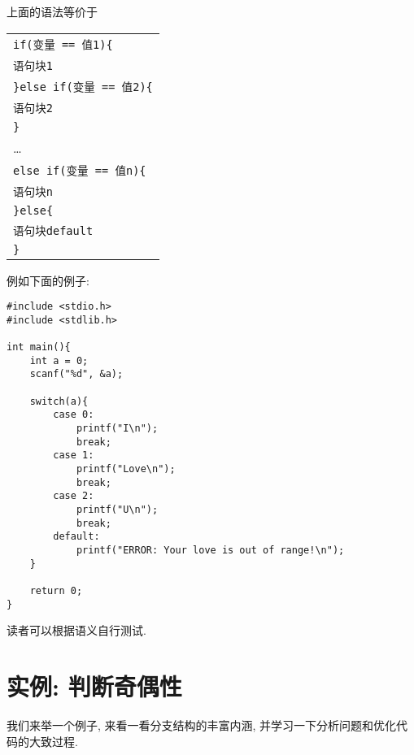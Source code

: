                 上面的语法等价于
                \begin{center}
                \begin{longtable}{l}
                    \texttt{if(变量 == 值\hspace*{-0.25pt}\texttt{1})\{} \\
                    \qquad \texttt{语句块\hspace*{-0.25pt}\texttt{1}} \\
                    \texttt{\}else if(变量 == 值\hspace*{-0.25pt}\texttt{2})\{} \\
                    \qquad \texttt{语句块\hspace*{-0.25pt}\texttt{2}} \\
                    \texttt{\}} \\
                    \dots \\
                    \texttt{else if(变量 == 值\hspace*{-0.25pt}\texttt{n})\{} \\
                    \qquad \texttt{语句块\hspace*{-0.25pt}\texttt{n}} \\
                    \texttt{\}else\{} \\
                    \qquad \texttt{语句块\hspace*{-0.25pt}\texttt{default}} \\
                    \texttt{\}}
                \end{longtable}
                \end{center}

                例如下面的例子:
\begin{lstlisting}
#include <stdio.h>
#include <stdlib.h>

int main(){
    int a = 0;
    scanf("%d", &a);

    switch(a){
        case 0:
            printf("I\n");
            break;
        case 1:
            printf("Love\n");
            break;
        case 2:
            printf("U\n");
            break;
        default:
            printf("ERROR: Your love is out of range!\n");
    }

    return 0;
}
\end{lstlisting}

                读者可以根据语义自行测试.

    \section{实例: 判断奇偶性}
        我们来举一个例子, 来看一看分支结构的丰富内涵, 并学习一下分析问题和优化代码的大致过程.

